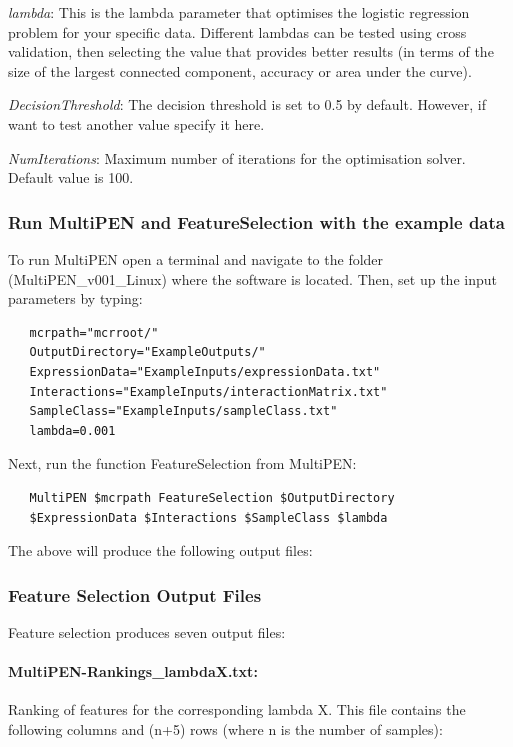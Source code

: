 \documentclass[11pt, oneside]{article}   	%
\begin{document}
{\it lambda}: This is the lambda parameter that optimises the logistic regression problem for your specific data. Different lambdas can be tested using cross validation, then selecting the value that provides better results (in terms of the size of the largest connected component, accuracy or area under the curve).  

{\it DecisionThreshold}: The decision threshold is set to 0.5 by default. However, if want to test another value specify it here.

{\it NumIterations}: Maximum number of iterations for the optimisation solver. Default value is 100.


\subsubsection{Run MultiPEN and FeatureSelection with the example data}


To run MultiPEN open a terminal and navigate to the folder (MultiPEN\_v001\_Linux) where the software is located. Then, set up the input parameters by typing:

\begin{framed}
\begin{verbatim}
   mcrpath="mcrroot/" 
   OutputDirectory="ExampleOutputs/"
   ExpressionData="ExampleInputs/expressionData.txt"
   Interactions="ExampleInputs/interactionMatrix.txt"
   SampleClass="ExampleInputs/sampleClass.txt"
   lambda=0.001
\end{verbatim}
\end{framed}


Next, run the function FeatureSelection from MultiPEN:

\begin{framed}
\begin{verbatim}
   MultiPEN $mcrpath FeatureSelection $OutputDirectory
   $ExpressionData $Interactions $SampleClass $lambda
\end{verbatim}
\end{framed}


The above will produce the following output files:

\subsubsection{Feature Selection Output Files}


Feature selection produces seven output files: 

\paragraph{MultiPEN-Rankings\_lambdaX.txt:} Ranking of features for the corresponding lambda X. 
This file contains the following columns and (n+5) rows (where n is the number of samples):
\end{document}
